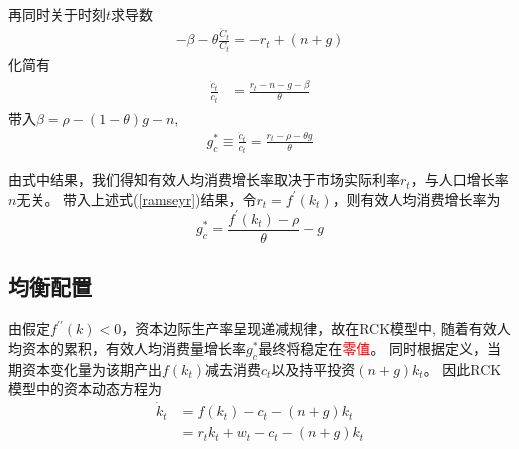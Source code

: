 \documentclass[cn,normal,11pt,black]{elegantnote}
\begin{document}
        再同时关于时刻$t$求导数
        \begin{align}
            -\beta-\theta \frac{\dot{C}_t}{C_t}=-r_t+(n+g)
        \end{align}
        化简有
        \begin{align} 
            \begin{aligned} 
                \frac{\dot{c}_t}{c_t} &=\frac{r_t-n-g-\beta}{\theta}                          
            \end{aligned}
        \end{align}
        带入$\beta = \rho - (1-\theta)g - n$,
        \begin{align} \label{ramseygc}
            g_c^* \equiv \frac{\dot{c}_t}{c_t}= \frac{r_t-\rho-\theta g}{\theta}
        \end{align}
        
        由式中结果，我们得知有效人均消费增长率取决于市场实际利率$r_t$，与人口增长率$n$无关。
        带入上述式(\ref{ramseyr})结果，令$r_t=f^\prime(k_t)$，则有效人均消费增长率为
            \begin{equation}
                g_c^*  = \frac{f^\prime(k_t) - \rho}{\theta} - g
            \end{equation}

\subsection{均衡配置} 

    由假定$f^{\prime \prime}(k) < 0$，资本边际生产率呈现递减规律，故在RCK模型中,
    随着有效人均资本的累积，有效人均消费量增长率$g_c^*$最终将稳定在\textcolor{red}{零值}。
    同时根据定义，当期资本变化量为该期产出$f(k_t)$减去消费$c_t$以及持平投资$(n+g)k_t$。
    因此RCK模型中的资本动态方程为
    \begin{align}  \label{ramseygky}
        \dot{k}_t & = f(k_t) - c_t - (n+g)k_t \\ 
                & = r_tk_t + w_t - c_t - (n+g)k_t 
    \end{align}
\end{document}
